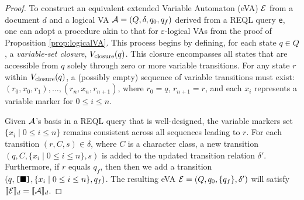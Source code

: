 \begin{proof}
	To construct an equivalent extended Variable Automaton (eVA) $\mathcal{E}$ from a
	document $d$ and a logical VA $\mathcal{A} = (Q, \delta, q_0, q_f)$ derived from a
	REQL query \texttt{e}, one can adopt a procedure akin to that for
	$\varepsilon$-logical VAs from the proof of Proposition
	\ref{prop:logicalVA}. This process begins by defining, for each state $q \in
	Q$, a \emph{variable-set closure}, $V_{\text{closure}}(q)$. This closure encompasses
	all states that are accessible from $q$ solely through zero or more variable
	transitions. For any state $r$ within $V_{\text{closure}}(q)$, a (possibly empty)
	sequence  of variable transitions must exist: $(r_0, x_0, r_1), \ldots,
	(r_n, x_n, r_{n+1})$, where $r_0 = q$, $r_{n+1} = r$, and each $x_i$
	represents a variable marker for $0 \leq i \leq n$. 
	
	Given $\mathcal{A}$'s basis in a REQL query that is well-designed, the variable
	markers set $\{x_i \mid 0 \leq i \leq n\}$ remains consistent across all
	sequences leading to $r$. For each transition $(r, C, s) \in \delta$, where
	$C$ is a character class, a new transition $(q, C, \{x_i \mid 0 \leq i \leq
	n\}, s)$ is added to the updated transition relation $\delta'$. Furthermore,
	if $r$ equals $q_f$, then then we add a transition $(q,
	\texttt{[}\blacksquare\texttt{]}, \{x_i \mid 0 \leq i \leq n\}, q_f)$. The
	resulting eVA $\mathcal{E} = (Q, q_0, \{q_f\}, \delta')$ will satisfy $\llbracket\mathcal{E}\rrbracket_d =
	\llbracket\mathcal{A}\rrbracket_d$.
\end{proof}


